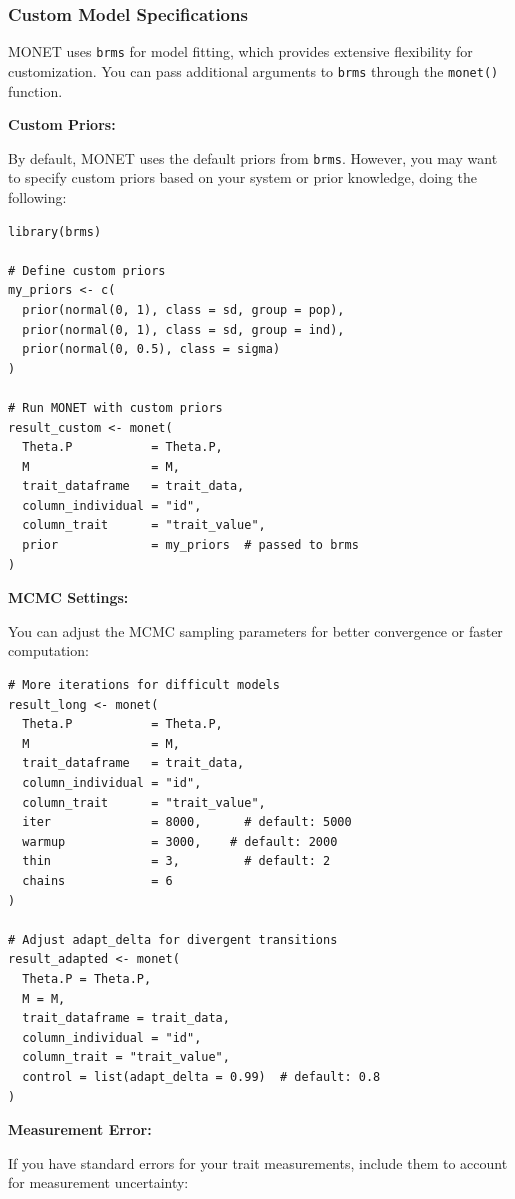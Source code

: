 \documentclass[11pt]{article}
\begin{document}
\subsubsection{Custom Model Specifications}

MONET uses \texttt{brms} for model fitting, which provides extensive flexibility for customization. You can pass additional arguments to \texttt{brms} through the \texttt{monet()} function.

\textbf{Custom Priors:}

By default, MONET uses the default priors from \texttt{brms}. However, you may want to specify custom priors based on your system or prior knowledge, doing the following:

\begin{lstlisting}
library(brms)

# Define custom priors
my_priors <- c(
  prior(normal(0, 1), class = sd, group = pop),
  prior(normal(0, 1), class = sd, group = ind),
  prior(normal(0, 0.5), class = sigma)
)

# Run MONET with custom priors
result_custom <- monet(
  Theta.P           = Theta.P,
  M                 = M,
  trait_dataframe   = trait_data,
  column_individual = "id",
  column_trait      = "trait_value",
  prior             = my_priors  # passed to brms
)
\end{lstlisting}

\textbf{MCMC Settings:}

You can adjust the MCMC sampling parameters for better convergence or faster computation:

\begin{lstlisting}
# More iterations for difficult models
result_long <- monet(
  Theta.P           = Theta.P,
  M                 = M,
  trait_dataframe   = trait_data,
  column_individual = "id",
  column_trait      = "trait_value",
  iter              = 8000,      # default: 5000
  warmup            = 3000,    # default: 2000
  thin              = 3,         # default: 2
  chains            = 6       
)

# Adjust adapt_delta for divergent transitions
result_adapted <- monet(
  Theta.P = Theta.P,
  M = M,
  trait_dataframe = trait_data,
  column_individual = "id",
  column_trait = "trait_value",
  control = list(adapt_delta = 0.99)  # default: 0.8
)
\end{lstlisting}

\textbf{Measurement Error:}

If you have standard errors for your trait measurements, include them to account for measurement uncertainty:
\end{document}
